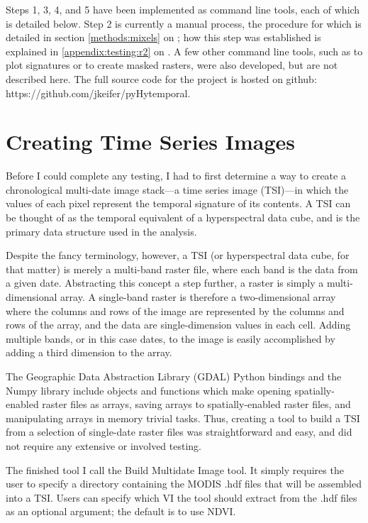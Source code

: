 Steps 1, 3, 4, and 5 have been implemented as command line tools, each of which is detailed below. Step 2 is currently a manual process, the procedure for which is detailed in section \autoref{methods:mixels} on ; how this step was established is explained in \autoref{appendix:testing:r2} on . A few other command line tools, such as to plot signatures or to create masked rasters, were also developed, but are not described here. The full source code for the project is hosted on github: https://github.com/jkeifer/pyHytemporal. 

\section{Creating Time Series Images}
\label{appendix:tools:build}

Before I could complete any testing, I had to first determine a way to create a chronological multi-date image stack---a time series image (TSI)---in which the values of each pixel represent the temporal signature of its contents. A TSI can be thought of as the temporal equivalent of a hyperspectral data cube, and is the primary data structure used in the analysis.

Despite the fancy terminology, however, a TSI (or hyperspectral data cube, for that matter) is merely a multi-band raster file, where each band is the data from a given date. Abstracting this concept a step further, a raster is simply a multi-dimensional array. A single-band raster is therefore a two-dimensional array where the columns and rows of the image are represented by the columns and rows of the array, and the data are single-dimension values in each cell. Adding multiple bands, or in this case dates, to the image is easily accomplished by adding a third dimension to the array.

The Geographic Data Abstraction Library (GDAL) Python bindings and the Numpy library include objects and functions which make opening spatially-enabled raster files as arrays, saving arrays to spatially-enabled raster files, and manipulating arrays in memory trivial tasks. Thus, creating a tool to build a TSI from a selection of single-date raster files was straightforward and easy, and did not require any extensive or involved testing.

The finished tool I call the Build Multidate Image tool. It simply requires the user to specify a directory containing the MODIS .hdf files that will be assembled into a TSI. Users can specify which VI the tool should extract from the .hdf files as an optional argument; the default is to use NDVI.

